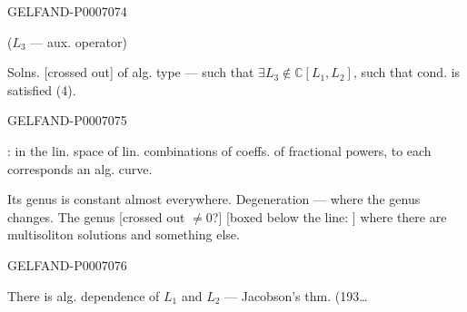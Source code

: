 \begin{GelfandAdjacentEvidence}{GELFAND-P000707}{4}

(\(L_3\) --- aux. operator)

Solns. [crossed out] of alg. type --- such that
\(\exists L_3\notin\mathbb C[L_1,L_2]\), such that cond. is satisfied (4).
\end{GelfandAdjacentEvidence}
\begin{GelfandAdjacentEvidence}{GELFAND-P000707}{5}


: in the lin. space of lin. combinations of coeffs. of fractional powers, to each corresponds an alg. curve.

Its genus is constant almost everywhere. Degeneration --- where the genus changes.
The genus [crossed out \(\ne 0\)?] [boxed below the line: ]
where there are multisoliton solutions and something else.
\end{GelfandAdjacentEvidence}
\begin{GelfandAdjacentEvidence}{GELFAND-P000707}{6}


There is alg. dependence of \(L_1\) and \(L_2\) --- Jacobson’s thm. (193…
\end{GelfandAdjacentEvidence}



